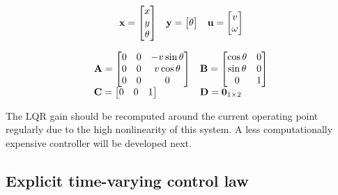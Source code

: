 \begin{theorem}
  \label{thm:linearized_unicycle_model}
  \begin{equation*}
    \begin{array}{ccc}
      \mathbf{x} =
      \begin{bmatrix}
        x \\
        y \\
        \theta \\
      \end{bmatrix} &
      \mathbf{y} =
      \begin{bmatrix}
        \theta
      \end{bmatrix} &
      \mathbf{u} =
      \begin{bmatrix}
        v \\
        \omega
      \end{bmatrix}
    \end{array}
  \end{equation*}

  \begin{equation}
    \begin{array}{ll}
      \mathbf{A} =
      \begin{bmatrix}
        0 & 0 & -v\sin\theta \\
        0 & 0 & v\cos\theta \\
        0 & 0 & 0
      \end{bmatrix} &
      \mathbf{B} =
      \begin{bmatrix}
        \cos\theta & 0 \\
        \sin\theta & 0 \\
        0 & 1
      \end{bmatrix} \\
      \mathbf{C} =
      \begin{bmatrix}
        0 & 0 & 1
      \end{bmatrix} &
      \mathbf{D} = \mathbf{0}_{1 \times 2}
    \end{array}
  \end{equation}

  The LQR gain should be recomputed around the current operating point regularly
  due to the high nonlinearity of this system. A less computationally expensive
  controller will be developed next.
\end{theorem}

\subsection{Explicit time-varying control law}

